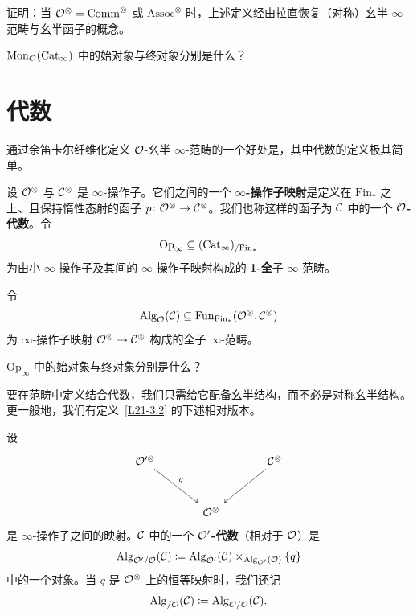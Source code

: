 \begin{exercise}\label{L21-2.19}
证明：当 $\mathcal{O}^{\otimes}=\mathrm{Comm}^{\otimes}$ 或 $\mathrm{Assoc}^{\otimes}$ 时，上述定义经由拉直恢复（对称）幺半 $\infty$-范畴与幺半函子的概念。
\end{exercise}

\begin{exercise}\label{L21-2.20}
$\operatorname{Mon}_{\mathcal{O}}(\operatorname{Cat}_{\infty})$ 中的始对象与终对象分别是什么？
\end{exercise}

\section{代数}

\nitem\label{L21-3.1} 通过余笛卡尔纤维化定义 $\mathcal{O}$-幺半 $\infty$-范畴的一个好处是，其中代数的定义极其简单。

\begin{definition}\label{L21-3.2}
设 $\mathcal{O}^{\otimes}$ 与 $\mathcal{C}^{\otimes}$ 是 $\infty$-操作子。它们之间的一个 \textbf{$\infty$-操作子映射}是定义在 $\mathrm{Fin}_{*}$ 之上、且保持惰性态射的函子 $p\colon\mathcal{O}^{\otimes}\to\mathcal{C}^{\otimes}$。我们也称这样的函子为 $\mathcal{C}$ 中的一个 \textbf{$\mathcal{O}$-代数}。令
\[
\mathrm{Op}_{\infty}\subseteq(\operatorname{Cat}_{\infty})_{/\mathrm{Fin}_{*}}
\]
为由小 $\infty$-操作子及其间的 $\infty$-操作子映射构成的 \textbf{1-全}子 $\infty$-范畴。

令
\[
\operatorname{Alg}_{\mathcal{O}}(\mathcal{C})\subseteq\operatorname{Fun}_{\mathrm{Fin}_{*}}(\mathcal{O}^{\otimes},\mathcal{C}^{\otimes})
\]
为 $\infty$-操作子映射 $\mathcal{O}^{\otimes}\to\mathcal{C}^{\otimes}$ 构成的全子 $\infty$-范畴。
\end{definition}

\begin{exercise}\label{L21-3.3}
$\mathrm{Op}_{\infty}$ 中的始对象与终对象分别是什么？
\end{exercise}

\nitem\label{L21-3.4} 要在范畴中定义结合代数，我们只需给它配备幺半结构，而不必是对称幺半结构。更一般地，我们有定义~\ref{L21-3.2} 的下述相对版本。

\begin{definition}\label{L21-3.5}
设
\[
\begin{tikzcd}[column sep=3.4em,row sep=3em]
\OO^{\prime\otimes}\arrow[dr,"q"] & & \cC^{\otimes}\arrow[dl] \\
& \OO^{\otimes} &
\end{tikzcd}
\]
是 $\infty$-操作子之间的映射。$\mathcal{C}$ 中的一个 \textbf{$\mathcal{O}'$-代数}（相对于 $\mathcal{O}$）是
\begin{equation}\label{L21-3.1eq}
\operatorname{Alg}_{\mathcal{O}'/\mathcal{O}}(\mathcal{C})\coloneqq\operatorname{Alg}_{\mathcal{O}'}(\mathcal{C})\times_{\operatorname{Alg}_{\mathcal{O}'}(\mathcal{O})}\{q\}
\end{equation}
中的一个对象。当 $q$ 是 $\mathcal{O}^{\otimes}$ 上的恒等映射时，我们还记
\[
\operatorname{Alg}_{/\mathcal{O}}(\mathcal{C})\coloneqq\operatorname{Alg}_{\mathcal{O}/\mathcal{O}}(\mathcal{C}).
\]
\end{definition}

